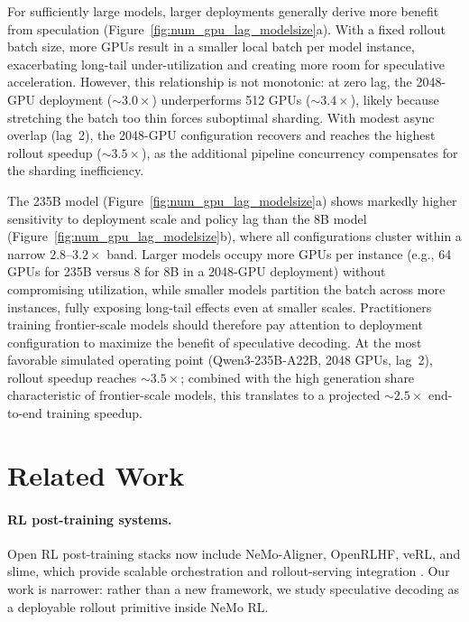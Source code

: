 \documentclass[11pt, logo, onecolumn, copyright, colorlinks=true, allcolors=blue]{nvidiatechreport}
\begin{document}
For sufficiently large models, larger deployments generally derive more benefit from speculation (Figure~\ref{fig:num_gpu_lag_modelsize}a). With a fixed rollout batch size, more GPUs result in a smaller local batch per model instance, exacerbating long-tail under-utilization and creating more room for speculative acceleration. However, this relationship is not monotonic: at zero lag, the 2048-GPU deployment (${\sim}3.0\times$) underperforms 512 GPUs (${\sim}3.4\times$), likely because stretching the batch too thin forces suboptimal sharding. With modest async overlap (lag~2), the 2048-GPU configuration recovers and reaches the highest rollout speedup (${\sim}3.5\times$), as the additional pipeline concurrency compensates for the sharding inefficiency.

The 235B model (Figure~\ref{fig:num_gpu_lag_modelsize}a) shows markedly higher sensitivity to deployment scale and policy lag than the 8B model (Figure~\ref{fig:num_gpu_lag_modelsize}b), where all configurations cluster within a narrow $2.8$--$3.2\times$ band. Larger models occupy more GPUs per instance (e.g., 64 GPUs for 235B versus 8 for 8B in a 2048-GPU deployment) without compromising utilization, while smaller models partition the batch across more instances, fully exposing long-tail effects even at smaller scales. Practitioners training frontier-scale models should therefore pay attention to deployment configuration to maximize the benefit of speculative decoding. At the most favorable simulated operating point (Qwen3-235B-A22B, 2048 GPUs, lag~2), rollout speedup reaches ${\sim}3.5\times$; combined with the high generation share characteristic of frontier-scale models, this translates to a projected ${\sim}2.5\times$ end-to-end training speedup.

\section{Related Work}
\label{sec:related_work}

\paragraph{RL post-training systems.}
Open RL post-training stacks now include NeMo-Aligner, OpenRLHF, veRL, and slime, which provide scalable orchestration and rollout-serving integration \citep{shen2024nemoaligner,hu2024openrlhf,sheng2024hybridflow,verl2025github,slime2025github}. Our work is narrower: rather than a new framework, we study speculative decoding as a deployable rollout primitive inside NeMo RL.
\end{document}
